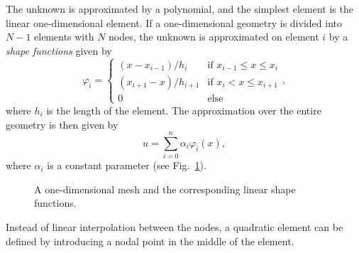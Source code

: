 The unknown is approximated by a polynomial, and the simplest element is the linear one-dimensional element. If a one-dimensional geometry is divided into $N-1$ elements with $N$ nodes, the unknown is approximated on element $i$ by a \textit{shape functions} given by
\begin{equation}
	\label{eq:shape_function}
	\varphi_i = 
	\begin{cases}
		(x-x_{i-1})/h_i & \text{if $x_{i-1} \leq x \leq x_i$} \\
		(x_{i+1}-x)/h_{i+1} & \text{if $x_i < x \leq x_{i+1}$} \\
		0 & \text{else}
	\end{cases}
	,
\end{equation}
where $h_i$ is the length of the element. The approximation over the entire geometry is then given by
\begin{equation}
	\label{eq:linear_approximation}
	u = \sum_{i=0}^n \alpha_i \varphi_i(x),
\end{equation}
where $\alpha_i$ is a constant parameter (see Fig.~\ref{fig:shape_function}).
\begin{figure}[t]
	\caption{A one-dimensional mesh and the corresponding linear shape functions.}
	\label{fig:shape_function}
\end{figure}
Instead of linear interpolation between the nodes, a quadratic element can be defined by introducing a nodal point in the middle of the element.~\cite[p.~1ff.]{larsson13}

